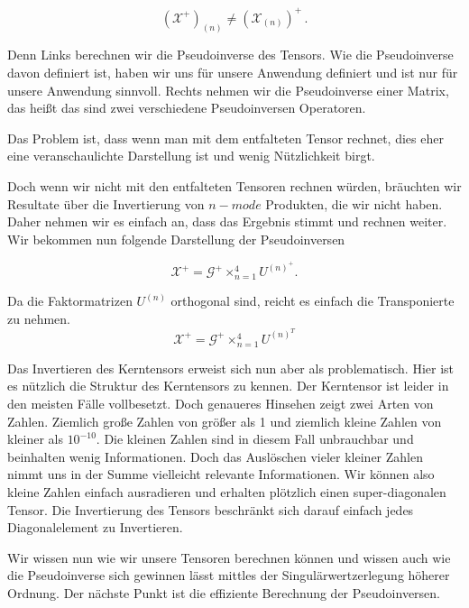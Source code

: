 \begin{equation*}
(\mathscr{X}^+)_{(n)} \neq (\mathscr{X}_{(n)})^+ \, .
\end{equation*}

Denn Links berechnen wir die Pseudoinverse des Tensors. Wie die Pseudoinverse davon definiert ist, haben wir uns für unsere Anwendung definiert und ist nur für unsere Anwendung sinnvoll. Rechts nehmen wir die Pseudoinverse einer Matrix, das heißt das sind zwei verschiedene Pseudoinversen Operatoren.

Das Problem ist, dass wenn man mit dem entfalteten Tensor rechnet, dies eher eine veranschaulichte Darstellung ist und wenig Nützlichkeit birgt.

Doch wenn wir nicht mit den entfalteten Tensoren rechnen würden, bräuchten wir Resultate über die Invertierung von $n-mode$ Produkten, die wir nicht haben. Daher nehmen wir es einfach an, dass das Ergebnis stimmt und rechnen weiter. Wir bekommen nun folgende Darstellung der Pseudoinversen

\begin{equation} \label{eq:pinv}
\pmb{\mathscr{X}}^{+} = \pmb{\mathscr{G}}^{+} \times_{n=1}^{4} U^{ (n) ^{+} }.
\end{equation}

Da die Faktormatrizen $U^{(n)}$ orthogonal sind, reicht es einfach die Transponierte zu nehmen. 
\begin{equation}
\pmb{\mathscr{X}}^+ = \pmb{\mathscr{G}}^{+} \times_{n=1}^{4} U^{ (n) ^{T} }
\end{equation}

Das Invertieren des Kerntensors erweist sich nun aber als problematisch.
Hier ist es nützlich die Struktur des Kerntensors zu kennen. Der Kerntensor ist leider in den meisten Fälle vollbesetzt. Doch genaueres Hinsehen zeigt zwei Arten von Zahlen. Ziemlich große Zahlen von größer als 1 und ziemlich kleine Zahlen von kleiner als $10^{-10}$. 
Die kleinen Zahlen sind in diesem Fall unbrauchbar und beinhalten wenig Informationen. Doch das Auslöschen vieler kleiner Zahlen nimmt uns in der Summe vielleicht relevante Informationen.
Wir können also kleine Zahlen einfach ausradieren und erhalten plötzlich einen super-diagonalen Tensor. Die Invertierung des Tensors beschränkt sich darauf einfach jedes Diagonalelement zu Invertieren.

Wir wissen nun wie wir unsere Tensoren berechnen können und wissen auch wie die Pseudoinverse sich gewinnen lässt mittles der Singulärwertzerlegung höherer Ordnung.
Der nächste Punkt ist die effiziente Berechnung der Pseudoinversen.



